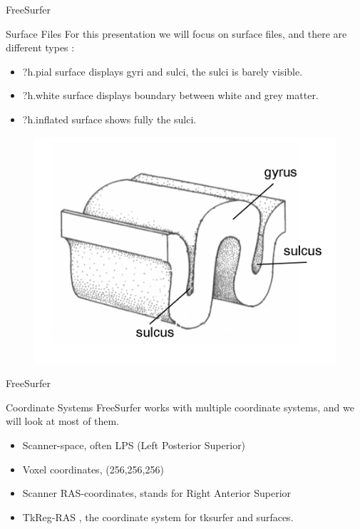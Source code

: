 \documentclass{beamer}
\begin{document}
\begin{frame}{FreeSurfer}
\begin{block}{Surface Files}
For this presentation we will focus on surface files, and there are different types : 
\begin{itemize}
\item<2-> ?h.pial surface displays gyri and sulci, the sulci is barely visible.
\item<3-> ?h.white surface displays boundary between white and grey matter.
\item<4-> ?h.inflated surface shows fully the sulci.   
\end{itemize}
\end{block}
 { 
\begin{figure}
\centering
\includegraphics[scale=0.25]{Gyrus_sulcus.png} 
\end{figure}}

\end{frame}

\begin{frame}{FreeSurfer}
\begin{block}{Coordinate Systems}
FreeSurfer works with multiple coordinate systems, and we will look at most of them.
	\begin{itemize}
	\item<2-> Scanner-space, often LPS (Left Posterior Superior)     
	\item<3-> Voxel coordinates, (256,256,256) 
	\item<4-> Scanner RAS-coordinates, stands for Right Anterior Superior
	\item<5-> TkReg-RAS , the coordinate system for tksurfer and surfaces. 
\end{itemize}
\end{block}
\end{frame}
\end{document}
